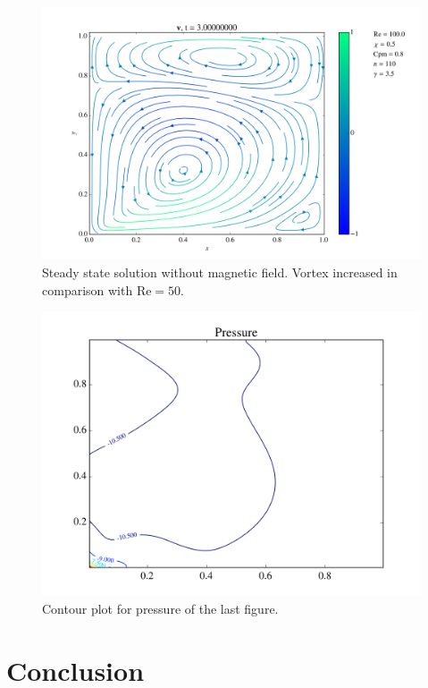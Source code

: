 \documentclass[journal]{IEEEtran}
\begin{document}
\begin{figure}[!t]
\centering
\includegraphics[width=\linewidth]{figures/Re100/w/vectorField}
\caption{Steady state solution without magnetic field. Vortex increased in comparison with $\mathrm{Re} = 50$. \label{Re100wVectorField}}
\end{figure}

\begin{figure}[!t]
\centering
\includegraphics[width=\linewidth]{figures/Re100/w/pressure}
\caption{Contour plot for pressure of the last figure. \label{Re100wPressure}}
\end{figure}



\section{Conclusion}
\end{document}
